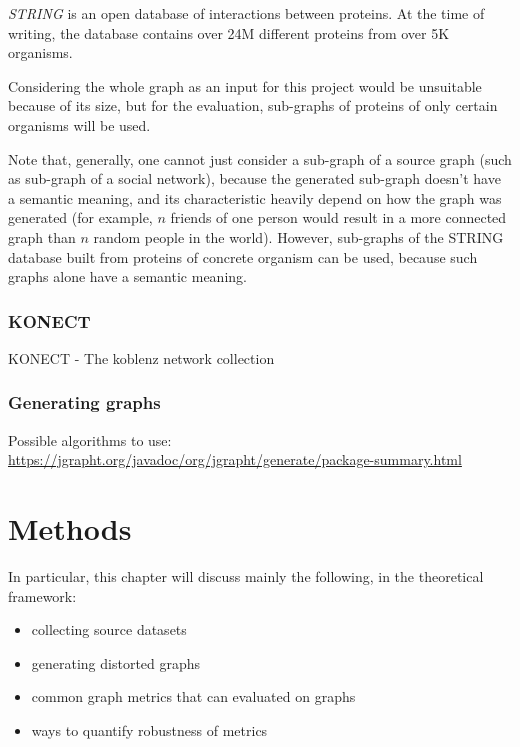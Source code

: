 \textit{STRING}\cite{Szklarczyk2019} is an open database of interactions between proteins.
At the time of writing, the database contains over 24M different proteins from over 5K organisms.

Considering the whole graph as an input for this project would be unsuitable because of its size, but for the evaluation, sub-graphs of proteins of only certain organisms will be used.

Note that, generally, one cannot just consider a sub-graph of a source graph (such as sub-graph of a social network), because the generated sub-graph doesn't have a semantic meaning, and its characteristic heavily depend on how the graph was generated (for example, $n$ friends of one person would result in a more connected graph than $n$ random people in the world).
However, sub-graphs of the STRING database built from proteins of concrete organism can be used, because such graphs alone have a semantic meaning.

\subsubsection{KONECT}

KONECT - The koblenz network collection\cite{Kunegis2013}

\subsubsection{Generating graphs}

Possible algorithms to use: \url{https://jgrapht.org/javadoc/org/jgrapht/generate/package-summary.html}


\section{Methods}

In particular, this chapter will discuss mainly the following, in the theoretical framework:
\begin{itemize}
    \item collecting source datasets
    \item generating distorted graphs
    \item common graph metrics that can evaluated on graphs
    \item ways to quantify robustness of metrics
\end{itemize}
